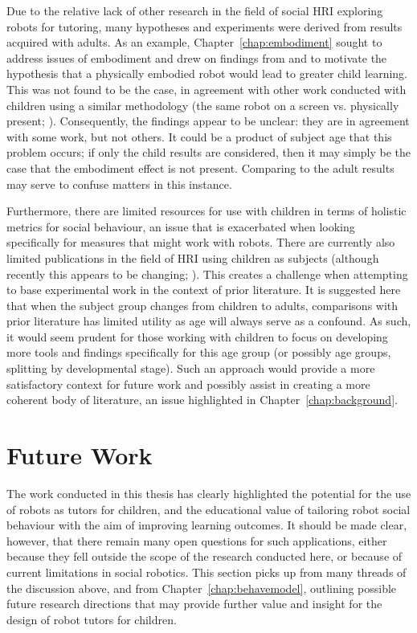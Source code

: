 Due to the relative lack of other research in the field of social HRI exploring robots for tutoring, many hypotheses and experiments were derived from results acquired with adults. As an example, Chapter~\ref{chap:embodiment} sought to address issues of embodiment and drew on findings from \citet{bartneck2003interacting} and \citet{leyzberg2012physical} to motivate the hypothesis that a physically embodied robot would lead to greater child learning. This was not found to be the case, in agreement with other work conducted with children using a similar methodology (the same robot on a screen vs. physically present; \citealp{looije2012help}). Consequently, the findings appear to be unclear: they are in agreement with some work, but not others. It could be a product of subject age that this problem occurs; if only the child results are considered, then it may simply be the case that the embodiment effect is not present. Comparing to the adult results may serve to confuse matters in this instance.

Furthermore, there are limited resources for use with children in terms of holistic metrics for social behaviour, an issue that is exacerbated when looking specifically for measures that might work with robots. There are currently also limited publications in the field of HRI using children as subjects (although recently this appears to be changing; \citealp{HRI2017hri}). This creates a challenge when attempting to base experimental work in the context of prior literature. It is suggested here that when the subject group changes from children to adults, comparisons with prior literature has limited utility as age will always serve as a confound. As such, it would seem prudent for those working with children to focus on developing more tools and findings specifically for this age group (or possibly age groups, splitting by developmental stage). Such an approach would provide a more satisfactory context for future work and possibly assist in creating a more coherent body of literature, an issue highlighted in Chapter~\ref{chap:background}.


\section{Future Work}\label{sec:conc-futurework}
The work conducted in this thesis has clearly highlighted the potential for the use of robots as tutors for children, and the educational value of tailoring robot social behaviour with the aim of improving \gls{learning} outcomes. It should be made clear, however, that there remain many open questions for such applications, either because they fell outside the scope of the research conducted here, or because of current limitations in social robotics. This section picks up from many threads of the discussion above, and from Chapter~\ref{chap:behavemodel}, outlining possible future research directions that may provide further value and insight for the design of robot tutors for children.

